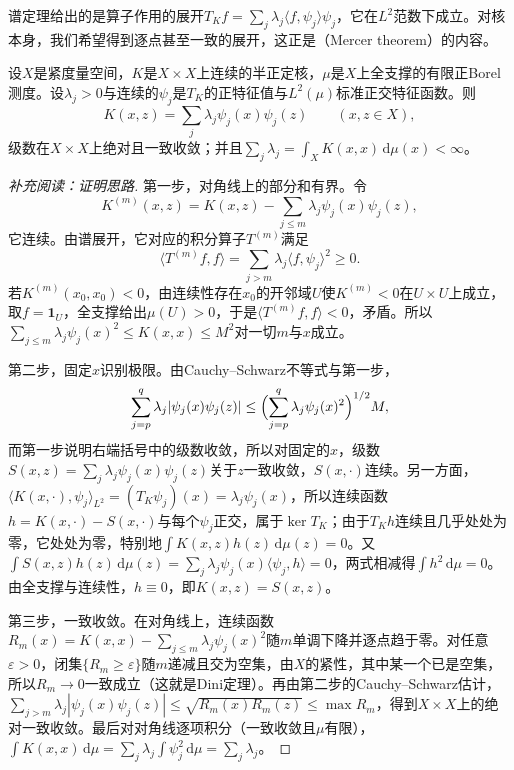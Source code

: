 谱定理给出的是算子作用的展开$T_Kf=\sum_j\lambda_j\langle f,\psi_j\rangle\psi_j$，它在$L^2$范数下成立。对核本身，我们希望得到逐点甚至一致的展开，这正是（Mercer theorem）的内容。

\begin{theorem}[Mercer定理]
\label{thm:rkhs-mercer}
设$X$是紧度量空间，$K$是$X\times X$上连续的半正定核，$\mu$是$X$上全支撑的有限正Borel测度。设$\lambda_j>0$与连续的$\psi_j$是$T_K$的正特征值与$L^2(\mu)$标准正交特征函数。则
\begin{equation}
K(x,z)=\sum_j\lambda_j\psi_j(x)\psi_j(z)\qquad(x,z\in X),
\label{eq:rkhs-mercer}
\end{equation}
级数在$X\times X$上绝对且一致收敛；并且$\sum_j\lambda_j=\int_XK(x,x)\,\mathrm d\mu(x)<\infty$。
\end{theorem}

\begin{proof}[补充阅读：证明思路]
第一步，对角线上的部分和有界。令
\[
K^{(m)}(x,z)=K(x,z)-\sum_{j\le m}\lambda_j\psi_j(x)\psi_j(z),
\]
它连续。由谱展开，它对应的积分算子$T^{(m)}$满足
\[
\langle T^{(m)}f,f\rangle=\sum_{j>m}\lambda_j\langle f,\psi_j\rangle^2\ge0 .
\]若$K^{(m)}(x_0,x_0)<0$，由连续性存在$x_0$的开邻域$U$使$K^{(m)}<0$在$U\times U$上成立，取$f=\mathbf 1_U$，全支撑给出$\mu(U)>0$，于是$\langle T^{(m)}f,f\rangle<0$，矛盾。所以$\sum_{j\le m}\lambda_j\psi_j(x)^2\le K(x,x)\le M^2$对一切$m$与$x$成立。

第二步，固定$x$识别极限。由Cauchy--Schwarz不等式与第一步，
\[
\sum_{j=p}^q\lambda_j|\psi_j(x)\psi_j(z)|\le\Bigl(\sum_{j=p}^q\lambda_j\psi_j(x)^2\Bigr)^{1/2}M ,
\]
而第一步说明右端括号中的级数收敛，所以对固定的$x$，级数$S(x,z)=\sum_j\lambda_j\psi_j(x)\psi_j(z)$关于$z$一致收敛，$S(x,\cdot)$连续。另一方面，$\langle K(x,\cdot),\psi_j\rangle_{L^2}=(T_K\psi_j)(x)=\lambda_j\psi_j(x)$，所以连续函数$h=K(x,\cdot)-S(x,\cdot)$与每个$\psi_j$正交，属于$\ker T_K$；由于$T_Kh$连续且几乎处处为零，它处处为零，特别地$\int K(x,z)h(z)\,\mathrm d\mu(z)=0$。又$\int S(x,z)h(z)\,\mathrm d\mu(z)=\sum_j\lambda_j\psi_j(x)\langle\psi_j,h\rangle=0$，两式相减得$\int h^2\,\mathrm d\mu=0$。由全支撑与连续性，$h\equiv0$，即$K(x,z)=S(x,z)$。

第三步，一致收敛。在对角线上，连续函数$R_m(x)=K(x,x)-\sum_{j\le m}\lambda_j\psi_j(x)^2$随$m$单调下降并逐点趋于零。对任意$\varepsilon>0$，闭集$\{R_m\ge\varepsilon\}$随$m$递减且交为空集，由$X$的紧性，其中某一个已是空集，所以$R_m\to0$一致成立（这就是Dini定理）。再由第二步的Cauchy--Schwarz估计，$\sum_{j>m}\lambda_j|\psi_j(x)\psi_j(z)|\le\sqrt{R_m(x)R_m(z)}\le\max R_m$，得到$X\times X$上的绝对一致收敛。最后对对角线逐项积分（一致收敛且$\mu$有限），$\int K(x,x)\,\mathrm d\mu=\sum_j\lambda_j\int\psi_j^2\,\mathrm d\mu=\sum_j\lambda_j$。
\end{proof}

